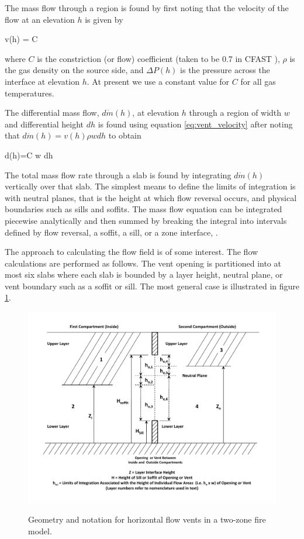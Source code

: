The mass flow through a region is found by first noting that the
velocity of the flow at an elevation $h$ is given by

\newcommand{\dmass}{d\dot{m}}
\be
v(h) = C 
\label{eq:vent_velocity}
\ee

\noindent where $C$ is the constriction (or flow) coefficient (taken to be 0.7 in CFAST \cite{Steckler_Coefficients}), $\rho$ is the gas density on the source side, and $\Delta P(h)$ is the pressure across the interface
at elevation $h$.  At present we use a constant value for $C$ for all gas temperatures.

The differential mass flow, $\dmass(h)$, at elevation $h$ through a region of width $w$ and differential height $dh$ is found using equation \ref{eq:vent_velocity} after noting that $\dmass(h)=v(h)\rho wdh$
to obtain

\be
\dmass(h)=C w dh
\label{eq:vent_massflow}
\ee

The total mass flow rate through a slab is found by integrating $\dmass(h)$ vertically over that slab.
The simplest means to define the limits of integration is with neutral planes, that is the height at which flow reversal occurs, and physical boundaries such as sills and soffits.  The mass flow equation can be integrated piecewise analytically and then summed by breaking the integral into intervals defined by flow reversal, a soffit, a sill, or a zone interface, .

The approach to calculating the flow field is of some interest.  The flow calculations are performed as follows.  The vent opening is partitioned into at most six slabs where each slab is bounded by a layer height, neutral plane, or vent boundary such as a soffit or sill.  The most general case is illustrated in figure \ref{fig:Flow_Notation}.

\begin{figure}[t]
\begin{center}
\includegraphics[width=6.0in]{FIGURES/Theory/Flow_Notation}\\
\end{center}
\caption{Geometry and notation for horizontal flow vents in a two-zone fire model.}
 \label{fig:Flow_Notation}
\end{figure}


